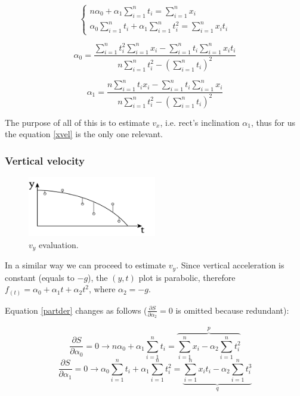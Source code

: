 \documentclass[notitlepage,a4paper,11pt]{article} %
\begin{document}
			\begin{equation} \label{partder}
				\begin{cases}
					n \alpha_0 + \alpha_1 \sum_{i=1}^n t_i = \sum_{i=1}^n x_i \\
					\alpha_0 \sum_{i=1}^n t_i + \alpha_1 \sum_{i=1}^n t_i^2 = \sum_{i=1}^n x_i t_i
				\end{cases}
			\end{equation}

			\begin{equation}
					\alpha_0 = \frac
					{\sum_{i=1}^n t_i^2 \sum_{i=1}^n x_i - \sum_{i=1}^n t_i \sum_{i=1}^n x_i t_i}
					{n \sum_{i=1}^n t_i^2 - (\sum_{i=1}^n t_i)^2}
			\end{equation}

			\begin{equation} \label{xvel}
					\alpha_1 = \frac
					{n \sum_{i=1}^n t_i x_i - \sum_{i=1}^n t_i \sum_{i=1}^n x_i}
					{n \sum_{i=1}^n t_i^2 - (\sum_{i=1}^n t_i)^2}
			\end{equation}

			The purpose of all of this is to estimate $v_x$, i.e. rect's inclination $\alpha_1$, thus for us the equation \eqref{xvel} is the only one relevant.

		\subsubsection{Vertical velocity}

		\begin{figure}[htb]
		\centering \includegraphics[width=0.5\textwidth]{vy}
			\caption{$v_y$ evaluation.}
		\end{figure}

			In a similar way we can proceed to estimate $v_y$. Since vertical acceleration is constant (equals to $-g$), the $(y,t)$ plot is parabolic, therefore $f_{(t)} = \alpha_0 + \alpha_1 t + \alpha_2 t^2$, where $\alpha_2 = -g$.

			Equation \eqref{partder} changes as follows ($\frac{\partial S}{\partial \alpha_2} = 0$ is omitted because redundant):

			\begin{equation}
				\frac{\partial S}{\partial \alpha_0} = 0 \to
				n \alpha_0 + \alpha_1 \sum_{i=1}^n t_i =
					\overbrace{\sum_{i=1}^n x_i - \alpha_2 \sum_{i=1}^n t_i^2}^p
			\end{equation}
			\begin{equation}
				\frac{\partial S}{\partial \alpha_1} = 0 \to
				\alpha_0 \sum_{i=1}^n t_i + \alpha_1 \sum_{i=1}^n t_i^2 =
					\underbrace{\sum_{i=1}^n x_i t_i - \alpha_2 \sum_{i=1}^n t_i^3}_q
			\end{equation}
\end{document}
